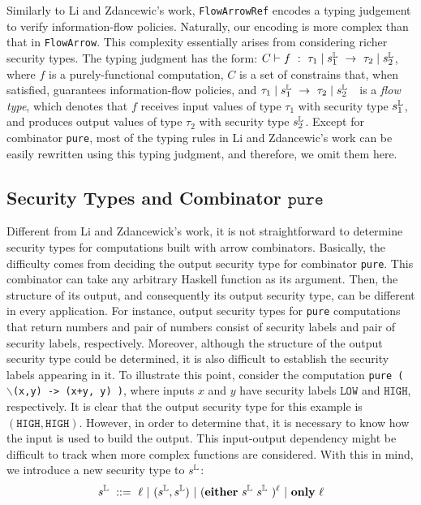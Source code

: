\documentclass[times, 10pt,twocolumn]{article}
\begin{document}
Similarly to Li and Zdancewic's work, \texttt{FlowArrowRef}
encodes a typing judgement to verify information-flow
policies. Naturally,  our encoding is more complex than 
that in \texttt{FlowArrow}. This complexity essentially 
arises from considering richer security types.
The typing judgment has the form:
$
 C  \vdash f~:~{\tau_{1}}\mid {s_{1}^{\mathbb{L}}}~->~{\tau_{2}}\mid {s_{2}^{\mathbb{L}}}
$, 
%
where $f$ is a purely-functional computation,  
$C$ is a set of constrains
that, when satisfied, guarantees information-flow policies, and 
$\res{\typn{1}}{\sts{1}}~->~\res{\typn{2}}{\sts{2}}\ \ $ is a \emph{flow
  type}, which denotes
that $f$ receives  input values of type $\tau_1$ with
security type $s_{1}^{\mathbb{L}}$, and produces output values of type
$\tau_2$ with security type $s_{2}^{\mathbb{L}}$. Except for 
combinator \texttt{pure}, 
most of the typing rules in 
Li and Zdancewic's work can be easily rewritten using this 
typing judgment, and therefore, we omit them here. 


\subsection{Security Types and Combinator  $\texttt{pure}$} \label{sec:pure}

Different from Li and Zdancewick's work, it is not 
straightforward to determine security types for computations 
built with arrow combinators. Basically, the difficulty comes from 
deciding the output security type for combinator \texttt{pure}. 
This combinator can take any arbitrary Haskell 
function as its argument. Then, the structure of its output, 
and consequently its output security type, can be different in every
application. 
For instance, output security types for \texttt{pure} computations
that return numbers and pair of numbers consist of security labels and 
pair of security labels, respectively. 
Moreover, 
although the structure of the output security
type could be determined, it is also
difficult to establish the security labels 
appearing in it. To illustrate this point, consider the 
computation 
\texttt{pure ( $\backslash$(x,y) -> (x+y, y) )}, where inputs 
$x$ and $y$ have security labels $\texttt{LOW}$ and
$\texttt{HIGH}$, respectively. 
It is clear that the output security
type for this example is $(\texttt{HIGH},
\texttt{HIGH})$. However, 
in order to determine that, it is necessary to 
know how the input is used to build the output.
This input-output dependency might be difficult to 
track when more complex functions are considered.
With this in mind, 
we introduce a new security
type to $s^{\mathbb{L}}$:
\[
\st\ ::=\ \ell\ |\ (\st,\st)\ |\ ({\mathbf{either}}\ \st\ \st\
)^{\ell}\ |\ \mathbf{only}\ \ell
\]
\end{document}
